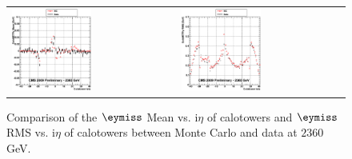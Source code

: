 \begin{figure}[h!]
 \centering
 \begin{tabular}{ll}
  \includegraphics[width=0.5\textwidth]{plots_DataVsMC_MB_2360GeV/g_calometPyMean_vs_ieta_2360.eps} &
  \includegraphics[width=0.5\textwidth]{plots_DataVsMC_MB_2360GeV/g_calometPyRMS_vs_ieta_2360.eps} \\
 \end{tabular}
 \caption{\small Comparison of the $\eymiss$ Mean vs. i$\eta$ of calotowers and $\eymiss$ RMS vs. i$\eta$ of calotowers between 
          Monte Carlo and data at $2360$ GeV.\label{fig:METy_MeanRMS_vs_ieta_2360}}
\end{figure}


\clearpage
